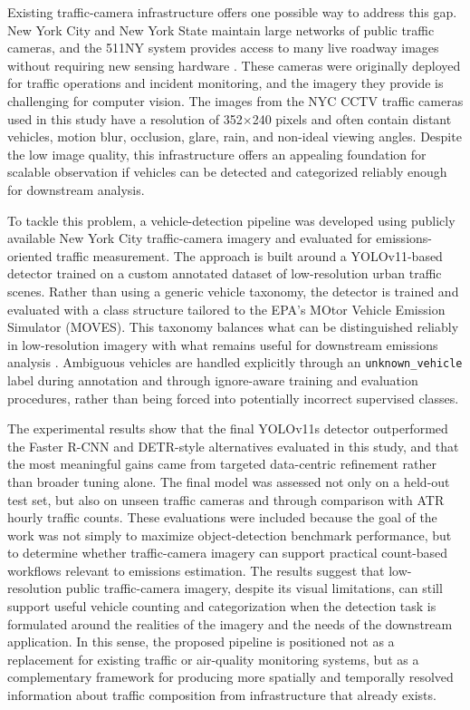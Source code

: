 Existing traffic-camera infrastructure offers one possible way to address this gap. New York City
and New York State maintain large networks of public traffic cameras, and the 511NY system
provides access to many live roadway images without requiring new sensing hardware
\cite{NYSDOT_c038145_2025, NYCDOT_realtime, 511ny_api_docs}.
These cameras were originally deployed for traffic operations and incident monitoring,
and the imagery they provide is challenging for computer vision. The images from the NYC CCTV traffic cameras
used in this study have a resolution of 352$\times$240 pixels and often contain distant vehicles, motion blur,
occlusion, glare, rain, and non-ideal viewing angles. Despite the low image quality, 
this infrastructure offers an appealing foundation for scalable observation if 
vehicles can be detected and categorized reliably enough for downstream analysis.

To tackle this problem, a vehicle-detection pipeline was developed using publicly available
New York City traffic-camera imagery and evaluated for emissions-oriented traffic measurement.
The approach is built around a YOLOv11-based detector trained on a custom annotated dataset of
low-resolution urban traffic scenes.
Rather than using a generic vehicle taxonomy, the detector is trained and evaluated with 
a class structure tailored to the EPA's MOtor Vehicle Emission Simulator (MOVES). This 
taxonomy balances what can be distinguished reliably in low-resolution imagery with what
remains useful for downstream emissions analysis
\cite{us_epa_moves3_2020}. Ambiguous vehicles are handled explicitly
through an \verb|unknown_vehicle| label during annotation and through ignore-aware training 
and evaluation procedures, rather than being forced into potentially incorrect supervised classes.

The experimental results show that the final YOLOv11s detector outperformed the Faster R-CNN
and DETR-style alternatives evaluated in this study, and that the most meaningful gains came from
targeted data-centric refinement rather than broader tuning alone. The final model was assessed
not only on a held-out test set, but also on unseen traffic cameras and through comparison with ATR
hourly traffic counts. These evaluations were included because the goal of the work was not simply
to maximize object-detection benchmark performance, but to determine whether traffic-camera
imagery can support practical count-based workflows relevant to emissions estimation.
The results suggest that low-resolution public traffic-camera imagery, despite its
visual limitations, can still support useful vehicle counting and categorization when the detection
task is formulated around the realities of the imagery and the needs of the downstream application.
In this sense, the proposed pipeline is positioned not as a replacement for existing traffic or
air-quality monitoring systems, but as a complementary framework for producing more spatially
and temporally resolved information about traffic composition from infrastructure that already exists.
